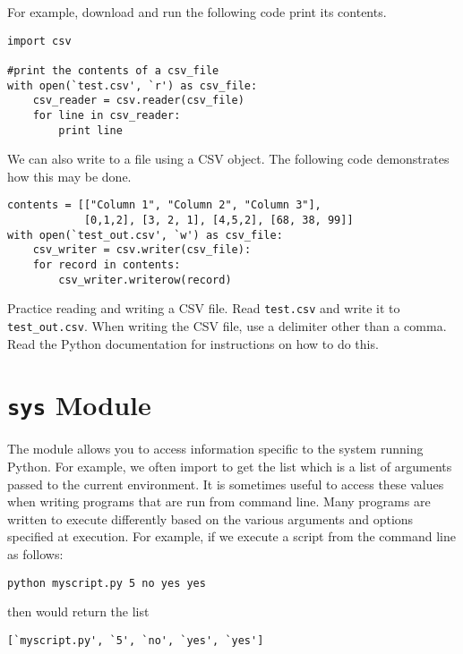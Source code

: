 \begin{enumerate}
For example, download  and run the following code print its contents.
\begin{lstlisting}
import csv

#print the contents of a csv_file
with open(`test.csv', `r') as csv_file:
    csv_reader = csv.reader(csv_file)
    for line in csv_reader:
        print line
\end{lstlisting}

We can also write to a  file using a CSV  object.  The following code demonstrates how this may be done.

\begin{lstlisting}
contents = [["Column 1", "Column 2", "Column 3"],
            [0,1,2], [3, 2, 1], [4,5,2], [68, 38, 99]]
with open(`test_out.csv', `w') as csv_file:
    csv_writer = csv.writer(csv_file):
    for record in contents:
        csv_writer.writerow(record)
\end{lstlisting}

\begin{problem}
Practice reading and writing a CSV file.
Read \texttt{test.csv} and write it to \texttt{test\_out.csv}.
When writing the CSV file, use a delimiter other than a comma.
Read the Python documentation for instructions on how to do this.
\end{problem}

\section*{\texttt{sys} Module}
The  module allows you to access information specific to the system running Python.
For example, we often import  to get the list  which is a list of arguments passed to the current environment.
It is sometimes useful to access these values when writing programs that are run from command line.
Many programs are written to execute differently based on the various arguments and options specified at execution.
For example, if we execute a script from the command line as follows:
\begin{verbatim}
python myscript.py 5 no yes yes
\end{verbatim}
then  would return the list
\begin{verbatim}
[`myscript.py', `5', `no', `yes', `yes']
\end{verbatim}



\end{enumerate}
